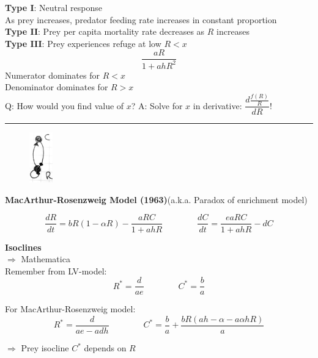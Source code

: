 \documentclass{article}
\newcommand{\note}[1]{\colorbox{gray!30}{#1}}
\newcommand{\ind}{\-\hspace{1cm}}
\begin{document}
\textbf{Type I}: Neutral response\\
\ind \ind As prey increases, predator feeding rate increases in constant proportion \\
\textbf{Type II}: Prey per capita mortality rate decreases as $R$ increases\\
\textbf{Type III}: Prey experiences refuge at low $R < x$
\begin{equation*}
\frac{a  R}{1+ahR^2}
\end{equation*}
\ind \ind \ind Numerator dominates for $R<x$\\
\ind \ind \ind Denominator dominates for $R>x$\\

\note{Q:} How would you find value of $x$?
\note{A:} Solve for $x$ in derivative: $\dfrac{d \frac{f(R)}{R}}{dR}$!

\rule[0.5ex]{\linewidth}{1pt}

\begin{figure}
\includegraphics[width=1cm]{figs/CR_digraph2.pdf}
\end{figure}

\textbf{MacArthur-Rosenzweig Model (1963)}(a.k.a. Paradox of enrichment model)

\begin{equation*}
	\frac{dR}{dt}=bR(1-\alpha R) - \frac{aRC}{1+ahR} \qquad \qquad  \frac{dC}{dt}=\frac{eaRC}{1+ahR}-dC 
\end{equation*}

\textbf{Isoclines}\\
\ind \note{$\Rightarrow$ Mathematica}\\

Remember from LV-model:
\begin{equation*}
	R^*=\frac{d}{ae} \qquad \qquad C^* = \frac{b}{a}
\end{equation*}

For MacArthur-Rosenzweig model:
\begin{equation*}
	R^*=\frac{d}{ae-adh} \qquad \qquad C^* = \frac{b}{a} + \frac{bR(ah-\alpha-a \alpha h R)}{a}
\end{equation*}
\begin{center} $\Rightarrow$ Prey isocline $C^*$ depends on $R$\end{center}
\end{document}
